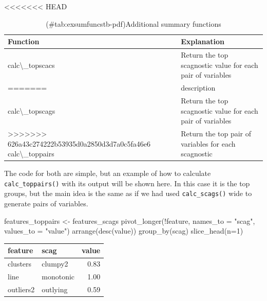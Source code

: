 \begin{Schunk}
\begin{table}

<<<<<<< HEAD
\caption{(\#tab:exsumfuncstb-pdf)Additional summary functions}
\centering
\begin{tabular}[t]{>{\raggedright\arraybackslash}p{3cm}l}
\toprule
Function & Explanation\\
\midrule
calc\textbackslash{}\_topscacs & Return the top scagnostic value for each pair of variables\\
=======
\begin{tabular}{l|l}
\hline
func\_name & description\\
\hline
calc\textbackslash{}\_topscags & Return the top scagnostic value for each pair of variables\\
\hline
>>>>>>> 626a43c274222b53935d0a2850d3d7a0c5fa46e6
calc\textbackslash{}\_toppairs & Return the top pair of variables for each scagnostic\\
\bottomrule
\end{tabular}
\end{table}

\end{Schunk}

The code for both are simple, but an example of how to calculate
\texttt{calc\_toppairs()} with its output will be shown here. In this
case it is the top groups, but the main idea is the same as if we had
used \texttt{calc\_scags()} wide to generate pairs of variables.

\begin{Schunk}
\begin{Sinput}
features_toppairs <- features_scags %
  pivot_longer(!feature, names_to = "scag", values_to = "value") %
  arrange(desc(value)) %
  group_by(scag) %
  slice_head(n=1)
\end{Sinput}
\end{Schunk}

\begin{Schunk}

\begin{tabular}{>{\raggedright\arraybackslash}p{3cm}lr}
\toprule
feature & scag & value\\
\midrule
clusters & clumpy2 & 0.83\\
line & monotonic & 1.00\\
outliers2 & outlying & 0.59\\
\bottomrule
\end{tabular}

\end{Schunk}

